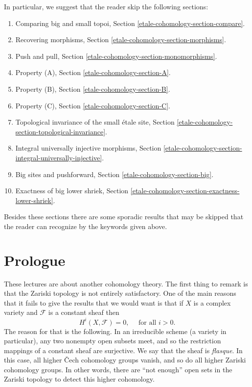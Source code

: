 \medskip\noindent
In particular, we suggest that the reader skip the following sections:
\begin{enumerate}
\item Comparing big and small topoi,
Section \ref{etale-cohomology-section-compare}.
\item Recovering morphisms,
Section \ref{etale-cohomology-section-morphisms}.
\item Push and pull,
Section \ref{etale-cohomology-section-monomorphisms}.
\item Property (A),
Section \ref{etale-cohomology-section-A}.
\item Property (B),
Section \ref{etale-cohomology-section-B}.
\item Property (C),
Section \ref{etale-cohomology-section-C}.
\item Topological invariance of the small \'etale site,
Section \ref{etale-cohomology-section-topological-invariance}.
\item Integral universally injective morphisms,
Section \ref{etale-cohomology-section-integral-universally-injective}.
\item Big sites and pushforward,
Section \ref{etale-cohomology-section-big}.
\item Exactness of big lower shriek,
Section \ref{etale-cohomology-section-exactness-lower-shriek}.
\end{enumerate}
Besides these sections there are some sporadic results that may be skipped
that the reader can recognize by the keywords given above.



\section{Prologue}
\label{etale-cohomology-section-prologue}
These lectures are about another cohomology theory. The first thing to remark
is that the Zariski topology is not entirely satisfactory. One of the main
reasons that it fails to give the results that we would want is that if $X$ is
a complex variety and $\mathcal{F}$ is a constant sheaf then
$$
H^i(X, \mathcal{F}) = 0, \quad \text{ for all } i > 0.
$$
The reason for that is the following. In an irreducible scheme (a variety in
particular), any two nonempty open subsets meet, and so the restriction
mappings of a constant sheaf are surjective. We say that the sheaf is
{\it flasque}. In this case, all higher {\v C}ech cohomology groups vanish, and
so do all higher Zariski cohomology groups. In other words, there are ``not
enough'' open sets in the Zariski topology to detect this higher cohomology.

